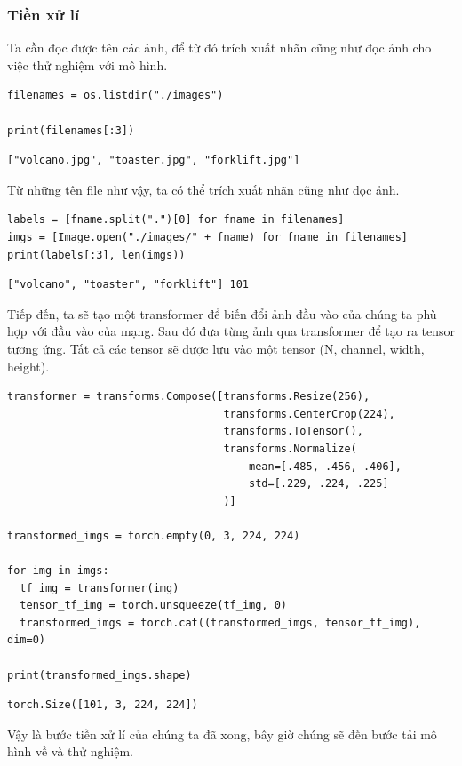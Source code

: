 \documentclass[a4paper]{article}
\begin{document}
\subsubsection{Tiền xử lí}
Ta cần đọc được tên các ảnh, để từ đó trích xuất nhãn cũng như đọc ảnh cho việc thử nghiệm với mô hình.
\begin{lstlisting}
filenames = os.listdir("./images")

print(filenames[:3])
\end{lstlisting}
\begin{verbatim}
["volcano.jpg", "toaster.jpg", "forklift.jpg"]    
\end{verbatim}
Từ những tên file như vậy, ta có thể trích xuất nhãn cũng như đọc ảnh.
\begin{lstlisting}
labels = [fname.split(".")[0] for fname in filenames]
imgs = [Image.open("./images/" + fname) for fname in filenames]
print(labels[:3], len(imgs))
\end{lstlisting}
\begin{verbatim}
["volcano", "toaster", "forklift"] 101
\end{verbatim}
Tiếp đến, ta sẽ tạo một transformer để biến đổi ảnh đầu vào của chúng ta phù hợp với đầu vào của mạng. Sau đó đưa từng ảnh qua transformer để tạo ra tensor tương ứng. Tất cả các tensor sẽ được lưu vào một tensor (N, channel, width, height).
\begin{lstlisting}
transformer = transforms.Compose([transforms.Resize(256),
                                  transforms.CenterCrop(224),
                                  transforms.ToTensor(),
                                  transforms.Normalize(
                                      mean=[.485, .456, .406],
                                      std=[.229, .224, .225]
                                  )]

transformed_imgs = torch.empty(0, 3, 224, 224)

for img in imgs:
  tf_img = transformer(img)
  tensor_tf_img = torch.unsqueeze(tf_img, 0)
  transformed_imgs = torch.cat((transformed_imgs, tensor_tf_img), dim=0)

print(transformed_imgs.shape)
\end{lstlisting}
\begin{verbatim}
torch.Size([101, 3, 224, 224])
\end{verbatim}
Vậy là bước tiền xử lí của chúng ta đã xong, bây giờ chúng sẽ đến bước tải mô hình về và thử nghiệm.
\end{document}
